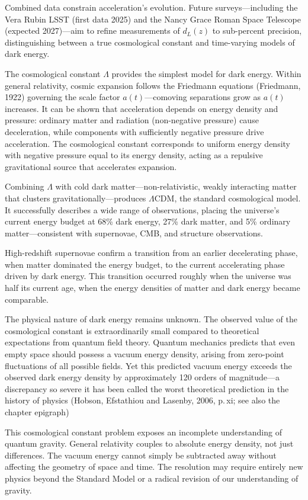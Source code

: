 Combined data constrain acceleration's evolution. Future surveys—including the Vera Rubin LSST (first data 2025) and the Nancy Grace Roman Space Telescope (expected 2027)—aim to refine measurements of $d_L(z)$ to sub-percent precision, distinguishing between a true cosmological constant and time-varying models of dark energy.

The cosmological constant $\Lambda$ provides the simplest model for dark energy. Within general relativity, cosmic expansion follows the Friedmann equations (Friedmann, 1922) governing the scale factor $a(t)$—comoving separations grow as $a(t)$ increases. It can be shown that acceleration depends on energy density and pressure: ordinary matter and radiation (non-negative pressure) cause deceleration, while components with sufficiently negative pressure drive acceleration. The cosmological constant corresponds to uniform energy density with negative pressure equal to its energy density, acting as a repulsive gravitational source that accelerates expansion.

Combining $\Lambda$ with cold dark matter—non-relativistic, weakly interacting matter that clusters gravitationally—produces $\Lambda$CDM, the standard cosmological model. It successfully describes a wide range of observations, placing the universe's current energy budget at 68\% dark energy, 27\% dark matter, and 5\% ordinary matter—consistent with supernovae, CMB, and structure observations.

High-redshift supernovae confirm a transition from an earlier decelerating phase, when matter dominated the energy budget, to the current accelerating phase driven by dark energy. This transition occurred roughly when the universe was half its current age, when the energy densities of matter and dark energy became comparable.

The physical nature of dark energy remains unknown. The observed value of the cosmological constant is extraordinarily small compared to theoretical expectations from quantum field theory. Quantum mechanics predicts that even empty space should possess a vacuum energy density, arising from zero-point fluctuations of all possible fields. Yet this predicted vacuum energy exceeds the observed dark energy density by approximately 120 orders of magnitude—a discrepancy so severe it has been called \QSOpen{}the worst theoretical prediction in the history of physics\QSClose{} (Hobson, Efstathiou and Lasenby, 2006, p.\,xi; see also the chapter epigraph)

This cosmological constant problem exposes an incomplete understanding of quantum gravity. General relativity couples to absolute energy density, not just differences. The vacuum energy cannot simply be subtracted away without affecting the geometry of space and time. The resolution may require entirely new physics beyond the Standard Model or a radical revision of our understanding of gravity.

